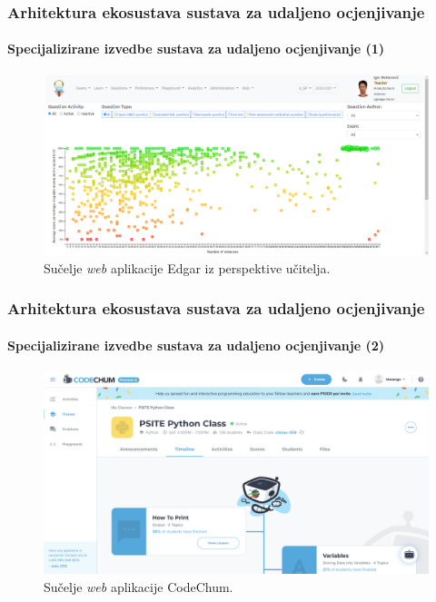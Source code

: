 \documentclass{beamer}
\newif\ifplacelogo
\begin{document}
\placelogofalse
\begin{frame}
\frametitle{Arhitektura ekosustava sustava za udaljeno ocjenjivanje}
\framesubtitle{Specijalizirane izvedbe sustava za udaljeno ocjenjivanje (1)}
\begin{figure}[htb]
	\centering
	\includegraphics[width=\textwidth]{images/Edgar UI.png}
	\caption{
		Sučelje \textit{web} aplikacije Edgar iz perspektive učitelja.
	}
\end{figure}
\end{frame}
\placelogotrue

\placelogofalse
\begin{frame}
\frametitle{Arhitektura ekosustava sustava za udaljeno ocjenjivanje}
\framesubtitle{Specijalizirane izvedbe sustava za udaljeno ocjenjivanje (2)}
\begin{figure}[htb]
	\centering
	\includegraphics[width=\textwidth]{images/CodeChum UI.png}
	\caption{
		Sučelje \textit{web} aplikacije CodeChum.
	}
\end{figure}
\end{frame}
\placelogotrue
\end{document}
